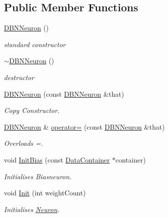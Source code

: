 \subsection*{Public Member Functions}
\begin{DoxyCompactItemize}
\item 
\hypertarget{class_n_n_t_lib_1_1_d_b_n_neuron_af445dc9c785101a92906545d17cfb332}{}\hyperlink{class_n_n_t_lib_1_1_d_b_n_neuron_af445dc9c785101a92906545d17cfb332}{D\+B\+N\+Neuron} ()\label{class_n_n_t_lib_1_1_d_b_n_neuron_af445dc9c785101a92906545d17cfb332}

\begin{DoxyCompactList}\small\item\em standard constructor \end{DoxyCompactList}\item 
\hypertarget{class_n_n_t_lib_1_1_d_b_n_neuron_a91f7afaf8367909137ab6105b0127ef1}{}\hyperlink{class_n_n_t_lib_1_1_d_b_n_neuron_a91f7afaf8367909137ab6105b0127ef1}{$\sim$\+D\+B\+N\+Neuron} ()\label{class_n_n_t_lib_1_1_d_b_n_neuron_a91f7afaf8367909137ab6105b0127ef1}

\begin{DoxyCompactList}\small\item\em destructor \end{DoxyCompactList}\item 
\hyperlink{class_n_n_t_lib_1_1_d_b_n_neuron_a6330de84d719d3aebbb9c4f9cf965406}{D\+B\+N\+Neuron} (const \hyperlink{class_n_n_t_lib_1_1_d_b_n_neuron}{D\+B\+N\+Neuron} \&that)
\begin{DoxyCompactList}\small\item\em Copy Constructor. \end{DoxyCompactList}\item 
\hyperlink{class_n_n_t_lib_1_1_d_b_n_neuron}{D\+B\+N\+Neuron} \& \hyperlink{class_n_n_t_lib_1_1_d_b_n_neuron_af497635d4a76b2d53ee1d1b5bc3cf826}{operator=} (const \hyperlink{class_n_n_t_lib_1_1_d_b_n_neuron}{D\+B\+N\+Neuron} \&that)
\begin{DoxyCompactList}\small\item\em Overloads =. \end{DoxyCompactList}\item 
void \hyperlink{class_n_n_t_lib_1_1_d_b_n_neuron_a69e9a06d177d18859aaba03913334c5d}{Init\+Bias} (const \hyperlink{class_n_n_t_lib_1_1_data_container}{Data\+Container} $\ast$container)
\begin{DoxyCompactList}\small\item\em Initialises Biasneuron. \end{DoxyCompactList}\item 
void \hyperlink{class_n_n_t_lib_1_1_d_b_n_neuron_a3958cfcba3cc6a9e371056739a282893}{Init} (int weight\+Count)
\begin{DoxyCompactList}\small\item\em Initialises \hyperlink{class_n_n_t_lib_1_1_neuron}{Neuron}. \end{DoxyCompactList}\end{DoxyCompactItemize}
